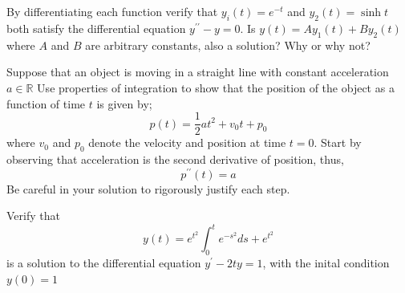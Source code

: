 \documentclass[12pt,letterpaper]{hmcpset}
\begin{document}
\section*{}






\begin{problem}[Problem 1]
By differentiating each function verify that $y_i(t)= e^{-t}$ and $y_2(t) = \sinh t$ both satisfy the differential equation $y^{\prime\prime}-y= 0$. Is $y(t) = Ay_1(t) +By_2(t)$ where $A$ and $B$ are arbitrary constants, also a solution? Why or why not?
\end{problem}
\newpage


\begin{problem}[2. ]
   Suppose that an object is moving in a straight line with constant acceleration $a \in \mathbb{R}$ Use properties of integration to show that the position of the object as a function of time $t$ is given by; 
   $$ p(t) = \frac{1}{2}at^2+v_0t+p_0$$
   where $v_0$ and $p_0$ denote the velocity and position at time $t=0$. Start by observing that acceleration is the second derivative of position, thus,
   $$ p^{\prime \prime} (t) = a$$
   Be careful in your solution to rigorously justify each step. 
\end{problem}

\begin{solution}
    \vfill
\end{solution}

\newpage


\begin{problem}[3]
   Verify that
   $$ y(t) = e^{t^2} \int_{0}^{t} e^{-s^2}ds+e^{t^2}$$
   is a solution to the differential equation $y^{\prime} -2ty = 1$, with the inital condition $y(0) = 1$
\end{problem}

\begin{solution}
    \vfill
\end{solution}

\newpage

\end{document}
